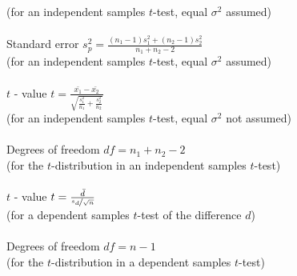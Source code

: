 \begin{minipage}[t]{.45\textwidth}
{\scriptsize (for an independent samples $t$-test, equal $\sigma^2$ assumed)} \\
\\
Standard error \hfill $s^2_p = \frac{(n_1 - 1) s^2_1 + (n_2 - 1) s^2_2}{n_1 + n_2 - 2}$\\
{\scriptsize (for an independent samples $t$-test, equal $\sigma^2$ assumed)} \\
\\
$t$ - value \hfill $t = \frac{\bar{x_1} - \bar{x_2}}
{\sqrt{\frac{s_1^2}{n_1} + \frac{s_2^2}{n_2}}}$\\
{\scriptsize (for an independent samples $t$-test, equal $\sigma^2$ not assumed)} \\
\\
Degrees of freedom \hfill $df = n_1 + n_2 - 2$\\
{\scriptsize (for the $t$-distribution in an independent samples $t$-test)} \\
\\
$t$ - value \hfill $t = \frac{\bar{d}}
{\nicefrac{s_d}{\sqrt{n}}}$\\
{\scriptsize (for a dependent samples $t$-test of the difference $d$)} \\
\\
Degrees of freedom \hfill $df =n - 1$\\
{\scriptsize (for the $t$-distribution in a dependent samples $t$-test)} \\
\end{minipage}

\clearpage %

